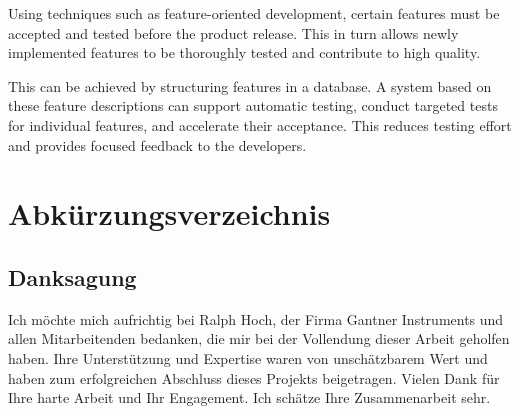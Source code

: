 \documentclass[a4paper, fontsize=11pt, parskip=half, twoside]{scrreprt}
\begin{document}
	Using techniques such as feature-oriented development, certain features must be accepted and tested before the product release. 
	This in turn allows newly implemented features to be thoroughly tested and contribute to high quality. 
	
	This can be achieved by structuring features in a database. 
	A system based on these feature descriptions can support automatic testing, conduct targeted tests for individual features, and accelerate their acceptance. 
	This reduces testing effort and provides focused feedback to the developers.
	
	\cleardoublepage   %
	\setcounter{tocdepth}{2}
	\setcounter{secnumdepth}{4}
	\tableofcontents
	
	\clearpage
	\listoffigures
	
	\clearpage
	\listoflistings
	
	\clearpage
	\chapter*{Abkürzungsverzeichnis}
	\begin{acronym}
	
	\end{acronym}
	
	\clearpage
	\section*{Danksagung}
	Ich möchte mich aufrichtig bei Ralph Hoch, der Firma Gantner Instruments und allen Mitarbeitenden bedanken, die mir bei der Vollendung dieser Arbeit geholfen haben. 
	Ihre Unterstützung und Expertise waren von unschätzbarem Wert und haben zum erfolgreichen Abschluss dieses Projekts beigetragen. 
	Vielen Dank für Ihre harte Arbeit und Ihr Engagement. 
	Ich schätze Ihre Zusammenarbeit sehr.
	
\end{document}
